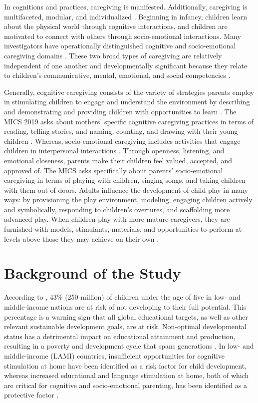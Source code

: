 \documentclass[
  12pt,
  oneside]{report}
\begin{document}
In cognitions and practices, caregiving is manifested. Additionally, caregiving is multifaceted, modular, and individualized \citep{bornstein2006parenting}. Beginning in infancy, children learn about the physical world through cognitive interactions, and children are motivated to connect with others through socio-emotional interactions. Many investigators have operationally distinguished cognitive and socio-emotional caregiving domains \citep{bornstein2006parenting}. These two broad types of caregiving are relatively independent of one another and developmentally significant because they relate to children's communicative, mental, emotional, and social competencies \citep{national2000neurons, walker2007child}.

Generally, cognitive caregiving consists of the variety of strategies parents
employ in stimulating children to engage and understand the environment by describing and demonstrating and providing children with opportunities to learn \citep{bornstein2012cognitive}. The MICS 2019 asks about mothers' specific cognitive
caregiving practices in terms of reading, telling stories, and naming, counting, and drawing with their young children \citep{mics}. Whereas, socio-emotional caregiving includes activities that engage children in interpersonal interactions \citep{bornstein2012cognitive}. Through openness, listening, and emotional closeness, parents make their children feel valued, accepted, and approved of. The MICS asks specifically about parents' socio-emotional caregiving in terms of playing with children, singing songs, and taking children with them out of doors. Adults influence the development of child play in many ways: by provisioning the play environment, modeling, engaging children actively and symbolically, responding to children's overtures, and scaffolding more advanced play. When children play with more mature caregivers, they are furnished with models, stimulants, materials, and opportunities to perform at levels above those they may achieve on their own \citep{vygotsky1978mind}.

\hypertarget{background-of-the-study}{%
\section{Background of the Study}\label{background-of-the-study}}

According to \citet{black2017early}, 43\% (250 million) of children under the age of five in low- and middle-income nations are at risk of not developing to their full potential. This percentage is a warning sign that all global educational targets, as well as other relevant sustainable development goals, are at risk. Non-optimal developmental status has a detrimental impact on educational attainment and production, resulting in a poverty and development cycle that spans generations \citep{engle2007strategies}. In low- and middle-income (LAMI) countries, insufficient opportunities for cognitive stimulation at home have been identified as a risk factor for child development, whereas increased educational and language stimulation at home, both of which are critical for cognitive and socio-emotional parenting, has been identified as a protective factor \citep{wachs2013nature}.
\end{document}
